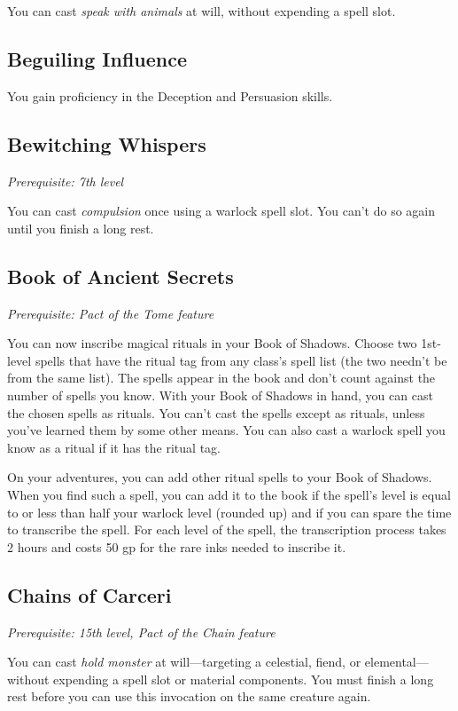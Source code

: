 You can cast \textit{speak with animals} at will, without expending a spell slot.

\subsection{Beguiling Influence}

You gain proficiency in the Deception and Persuasion skills.

\subsection{Bewitching Whispers}

\textit{Prerequisite: 7th level}

You can cast \textit{compulsion} once using a warlock spell slot. You can't do so again until you finish a long rest.

\subsection{Book of Ancient Secrets}

\textit{Prerequisite: Pact of the Tome feature}

You can now inscribe magical rituals in your Book of Shadows. Choose two 1st-level spells that have the ritual tag from any class's spell list (the two needn't be from the same list). The spells appear in the book and don't count against the number of spells you know. With your Book of Shadows in hand, you can cast the chosen spells as rituals. You can't cast the spells except as rituals, unless you've learned them by some other means. You can also cast a warlock spell you know as a ritual if it has the ritual tag.

On your adventures, you can add other ritual spells to your Book of Shadows. When you find such a spell, you can add it to the book if the spell's level is equal to or less than half your warlock level (rounded up) and if you can spare the time to transcribe the spell. For each level of the spell, the transcription process takes 2 hours and costs 50 gp for the rare inks needed to inscribe it.

\subsection{Chains of Carceri}

\textit{Prerequisite: 15th level, Pact of the Chain feature}

You can cast \textit{hold monster} at will—targeting a celestial, fiend, or elemental—without expending a spell slot or material components. You must finish a long rest before you can use this invocation on the same creature again.

